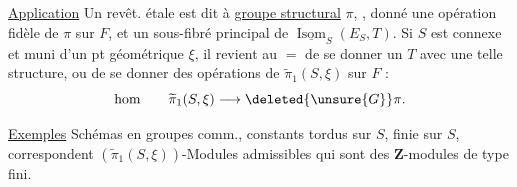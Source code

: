 \uline{Application} Un revêt. étale  est dit à \uline{groupe structural} $\pi$, ,   donné une opération fidèle de $\pi$ sur $F$, et un sous-fibré  principal de $\underline{\operatorname{Isom}}_S(E_S,T)$. Si $S$ est connexe et muni d'un pt géométrique $\xi$, il revient au $=$ de se donner un $T$ avec une telle structure, ou de se donner des opérations  de $\widetilde\pi_1(S,\xi)$  sur $F$ :
\[
\text{hom}\qquad\widetilde\pi_1(S,\xi)\longrightarrow\deleted{\unsure{G}}\pi.
\]

\uline{Exemples} Schémas en groupes comm., constants tordus sur $S$,   finie sur $S$, correspondent  $(\widetilde\pi_1(S,\xi))$-Modules admissibles  qui sont des $\mathbf Z$-modules de type fini.
